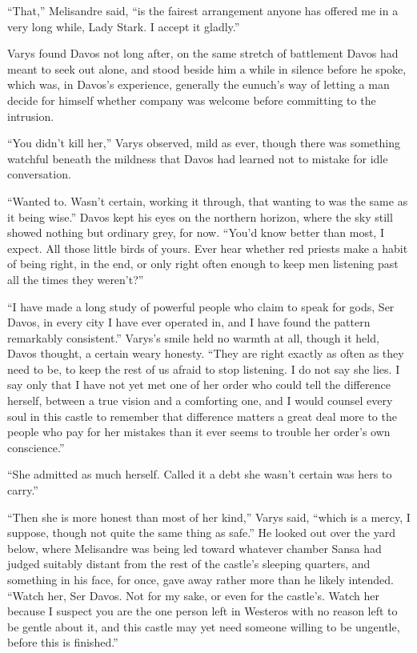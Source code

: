 “That,” Melisandre said, “is the fairest arrangement anyone has offered me in a very long while, Lady Stark. I accept it gladly.”

\sceneBreak

Varys found Davos not long after, on the same stretch of battlement Davos had meant to seek out alone, and stood beside him a while in silence before he spoke, which was, in Davos’s experience, generally the eunuch’s way of letting a man decide for himself whether company was welcome before committing to the intrusion.

“You didn’t kill her,” Varys observed, mild as ever, though there was something watchful beneath the mildness that Davos had learned not to mistake for idle conversation.

“Wanted to. Wasn’t certain, working it through, that wanting to was the same as it being wise.” Davos kept his eyes on the northern horizon, where the sky still showed nothing but ordinary grey, for now. “You’d know better than most, I expect. All those little birds of yours. Ever hear whether red priests make a habit of being right, in the end, or only right often enough to keep men listening past all the times they weren’t?”

“I have made a long study of powerful people who claim to speak for gods, Ser Davos, in every city I have ever operated in, and I have found the pattern remarkably consistent.” Varys’s smile held no warmth at all, though it held, Davos thought, a certain weary honesty. “They are right exactly as often as they need to be, to keep the rest of us afraid to stop listening. I do not say she lies. I say only that I have not yet met one of her order who could tell the difference herself, between a true vision and a comforting one, and I would counsel every soul in this castle to remember that difference matters a great deal more to the people who pay for her mistakes than it ever seems to trouble her order’s own conscience.”

“She admitted as much herself. Called it a debt she wasn’t certain was hers to carry.”

“Then she is more honest than most of her kind,” Varys said, “which is a mercy, I suppose, though not quite the same thing as safe.” He looked out over the yard below, where Melisandre was being led toward whatever chamber Sansa had judged suitably distant from the rest of the castle’s sleeping quarters, and something in his face, for once, gave away rather more than he likely intended. “Watch her, Ser Davos. Not for my sake, or even for the castle’s. Watch her because I suspect you are the one person left in Westeros with no reason left to be gentle about it, and this castle may yet need someone willing to be ungentle, before this is finished.”

